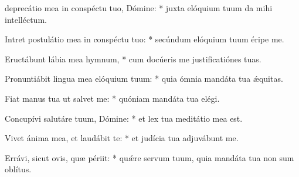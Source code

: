\begin{psalmus}

 deprecátio mea in conspéctu tuo, Dómine: * juxta elóquium tuum da mihi intelléctum.

Intret postulátio mea in conspéctu tuo: * secúndum elóquium tuum éripe me.

Eructábunt lábia mea hymnum, * cum docúeris me justificatiónes tuas.

Pronuntiábit lingua mea elóquium tuum: * quia ómnia mandáta tua ǽquitas.

Fiat manus tua ut salvet me: * quóniam mandáta tua elégi.

Concupívi salutáre tuum, Dómine: * et lex tua meditátio mea est.

Vivet ánima mea, et laudábit te: * et judícia tua adjuvábunt me.

Errávi, sicut ovis, quæ périit: * quǽre servum tuum, quia mandáta tua non sum oblítus.

\end{psalmus}
